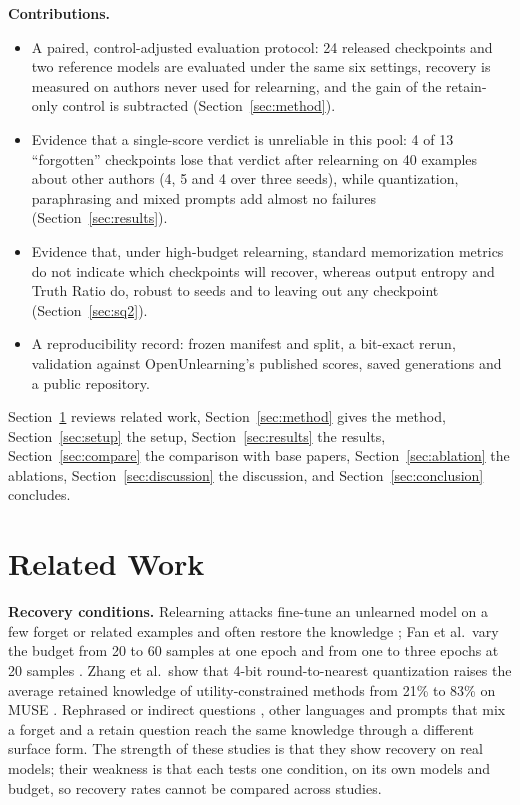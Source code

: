 \documentclass[conference]{IEEEtran}
\begin{document}
\textbf{Contributions.}
\begin{itemize}
\item A paired, control-adjusted evaluation protocol: 24 released checkpoints and two reference models are evaluated under the same six settings, recovery is measured on authors never used for relearning, and the gain of the retain-only control is subtracted (Section~\ref{sec:method}).
\item Evidence that a single-score verdict is unreliable in this pool: 4 of 13 ``forgotten'' checkpoints lose that verdict after relearning on 40 examples about other authors (4, 5 and 4 over three seeds), while quantization, paraphrasing and mixed prompts add almost no failures (Section~\ref{sec:results}).
\item Evidence that, under high-budget relearning, standard memorization metrics do not indicate which checkpoints will recover, whereas output entropy and Truth Ratio do, robust to seeds and to leaving out any checkpoint (Section~\ref{sec:sq2}).
\item A reproducibility record: frozen manifest and split, a bit-exact rerun, validation against OpenUnlearning's published scores, saved generations and a public repository.
\end{itemize}

Section~\ref{sec:related} reviews related work, Section~\ref{sec:method} gives the method, Section~\ref{sec:setup} the setup, Section~\ref{sec:results} the results, Section~\ref{sec:compare} the comparison with base papers, Section~\ref{sec:ablation} the ablations, Section~\ref{sec:discussion} the discussion, and Section~\ref{sec:conclusion} concludes.

\section{Related Work}\label{sec:related}
\textbf{Recovery conditions.} Relearning attacks fine-tune an unlearned model on a few forget or related examples and often restore the knowledge \cite{hu2025jogging,xu2026deletion}; Fan et al.\ vary the budget from 20 to 60 samples at one epoch and from one to three epochs at 20 samples \cite{fan2025sam}. Zhang et al.\ show that 4-bit round-to-nearest quantization raises the average retained knowledge of utility-constrained methods from 21\% to 83\% on MUSE \cite{zhang2025quant}. Rephrased or indirect questions \cite{wang2026erasing}, other languages \cite{hwang2026multilingual} and prompts that mix a forget and a retain question \cite{jeung2025seps} reach the same knowledge through a different surface form. The strength of these studies is that they show recovery on real models; their weakness is that each tests one condition, on its own models and budget, so recovery rates cannot be compared across studies.
\end{document}
